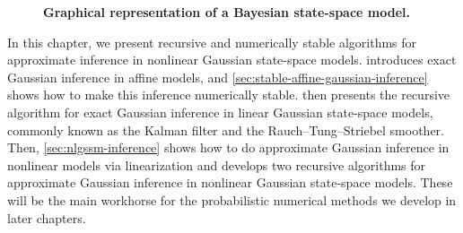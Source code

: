 \documentclass{mimosis}
\begin{document}
\begin{figure}[h]
  \centering
  \caption{\textbf{Graphical representation of a Bayesian state-space model.}}
  \label{fig:state-space-model}
\end{figure}

\par
In this chapter, we present recursive and numerically stable algorithms for approximate inference in nonlinear Gaussian state-space models.
 introduces exact Gaussian inference in affine models, and \cref{sec:stable-affine-gaussian-inference} shows how to make this inference numerically stable.
 then presents the recursive algorithm for exact Gaussian inference in linear Gaussian state-space models, commonly known as the Kalman filter and the Rauch--Tung--Striebel smoother.
Then, \cref{sec:nlgssm-inference} shows how to do approximate Gaussian inference in nonlinear models via linearization and develops two recursive algorithms for approximate Gaussian inference in nonlinear Gaussian state-space models.
These will be the main workhorse for the probabilistic numerical methods we develop in later chapters.
\end{document}
